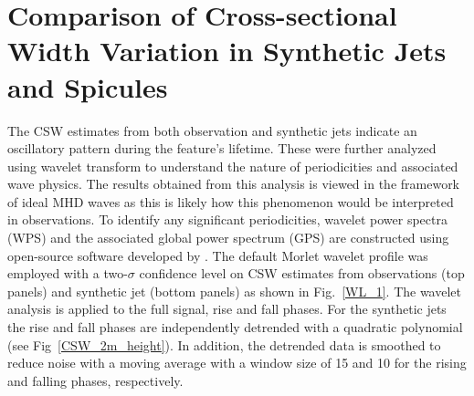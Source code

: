 \documentclass[12pt]{ociamthesis}
\newcommand{\np}{\\ \\}
\begin{document}
\section{Comparison of Cross-sectional Width Variation in Synthetic Jets and Spicules}
\label{sec:CSW_comp}
The CSW estimates from both observation and synthetic jets indicate an oscillatory pattern during the feature’s lifetime. These were further analyzed using wavelet transform to understand the nature of periodicities and associated wave physics. The results obtained from this analysis is viewed in the framework of ideal MHD waves as this is likely how this phenomenon would be interpreted in observations. To identify any significant periodicities, wavelet power spectra (WPS) and the associated global power spectrum (GPS) are constructed using open-source software developed by \cite{Torrence1998}. The default Morlet wavelet profile was employed with a two-$\sigma$ confidence level on CSW estimates from observations (top panels) and synthetic jet (bottom panels) as shown in Fig.~\ref{WL_1}. The wavelet analysis is applied to the full signal, rise and fall phases. For the synthetic jets the rise and fall phases are independently detrended with a quadratic polynomial (see Fig~\ref{CSW_2m_height}). In addition, the detrended data is smoothed to reduce noise with a moving average with a window size of 15 and 10 for the rising and falling phases, respectively. \np
%
\end{document}

